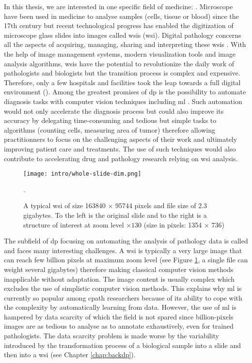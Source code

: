 In this thesis, we are interested in one specific field of medicine: . Microscope have been used in medicine to analyse samples (\eg cells, tissue or blood) since the 17th century \parencite{hajdu2002first} but recent technological progress has enabled the digitization of microscope glass slides into images called \acrlong{wsi}s (\acrshort{wsi}). Digital pathology concerns all the aspects of acquiring, managing, sharing and interpreting these \acrshort{wsi}s \parencite{doolan2019whatisdp}. With the help of image management systems, modern visualization tools and image analysis algorithms, \acrshort{wsi}s have the potential to revolutionize the daily work of pathologists and biologists but the transition process is complex and expensive. Therefore, only a few hospitals and facilities took the leap towards a full digital environment (\eg \cite{stathonikos2013going, eloy2021digital, temprana2022digipatics}). Among the greatest promises of \acrlong{dp} is the possibility to automate diagnosis tasks with computer vision techniques including \acrlong{ml} \parencite{ciompi2021editorial}. Such automation would not only accelerate the diagnosis process but could also improve its accuracy by delegating time-consuming and tedious but simple tasks to algorithms (\eg counting cells, measuring area of tumor) therefore allowing practitionners to focus on the challenging aspects of their work and ultimately improving patient care and treatments. The use of such techniques would also contribute to accelerating drug and pathology research relying on \acrlong{wsi} analysis. 

\begin{figure}
  \centering
  \texttt{[image: intro/whole-slide-dim.png]}
  \caption{A typical \acrlong{wsi} of size 163840 $\times$ 95744 pixels and file size of 2.3 gigabytes. To the left is the original slide and to the right is a structure of interest at zoom level $\times130$ (size in pixels: 1354 $\times$ 736)}.
  \label{fig:intro:wsi}
\end{figure}

The subfield of \acrlong{dp} focusing on automating the analysis of pathology data is called  and faces many interesting challenges. A \acrshort{wsi} is typically a very large image that can reach few billion pixels at maximum zoom level (see Figure \ref{fig:intro:wsi}, a single file can weight several gigabytes) therefore making classical computer vision methods inapplicable without adaptation. The image content is usually complex which excludes the use of simplistic computer vision methods. This explains why \acrlong{ml} is currently so popular among \acrlong{cpath} researchers because of its ability to cope with the complexity by automatically learning from data. However, the use of \acrlong{ml} is hampered by data scarcity of which the field is not spared since billion-pixels images are as tedious to analyse as to annotate exhaustively, even for trained pathologists. The data scarcity problem is made worse by the variability introduced by the transformation process of a biological sample into a slide and then into a \acrlong{wsi} (see Chapter \ref{chap:backdp}).

